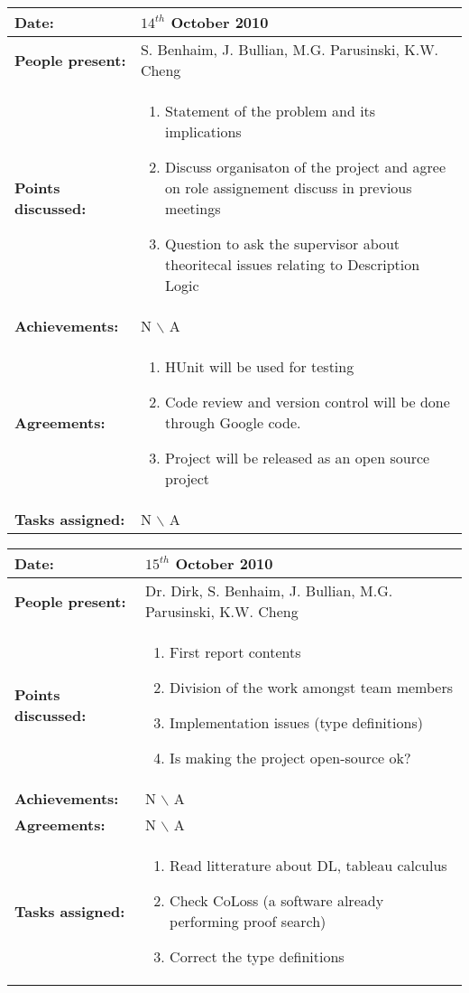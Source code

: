 \documentclass[12pt,a4paper]{article}
\newcommand{\meeting}[6]{%
\begin{center}%
\begin{longtable}{| p{3.5cm}  | p{13cm} |}%
\hline%
\textbf{Date:} & #1 \\%
\hline%
\textbf{People present:} &#2 \\%
\hline%
\textbf{Points discussed:} &#3\\%
\hline%
\textbf{Achievements:} &#4 \\%
\hline%
\textbf{Agreements:} &#5 \\%
\hline%
\textbf{Tasks assigned:} &#6  \\%
\hline%
\end{longtable}%
\end{center}%
\bigbreak
}
\begin{document}
\meeting{$14^{th}$ October 2010}%
{S. Benhaim, J. Bullian, M.G. Parusinski, K.W. Cheng}%
{ \begin{enumerate} \item Statement of the problem and its implications 
 \item Discuss organisaton of the project and agree on role assignement discuss in 
previous meetings
\item Question to ask the supervisor about theoritecal issues relating to Description Logic
\end{enumerate} }%
{ N $\backslash$ A}%
{ \begin{enumerate}
\item HUnit will be used for testing
\item Code review and version control will be done through Google code. 
\item Project will be released as an open source project
\end{enumerate}}%
{N $\backslash$ A}

\meeting{$15^{th}$ October 2010}%
{Dr. Dirk, S. Benhaim, J. Bullian, M.G. Parusinski, K.W. Cheng}%
{ \begin{enumerate} \item First report contents
\item Division of the work amongst team members
\item Implementation issues (type definitions)
\item Is making the project open-source ok?
\end{enumerate} }%
{ N $\backslash$ A}%
{N $\backslash$ A}
{ \begin{enumerate}
\item Read litterature about DL, tableau calculus
\item Check CoLoss (a software already performing proof search)
\item Correct the type definitions 
\end{enumerate}}%
\end{document}
